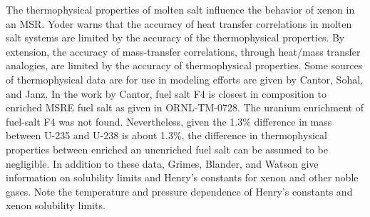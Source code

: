 The thermophysical properties of molten salt influence the behavior of xenon in an MSR.  Yoder warns that the accuracy of heat transfer correlations in molten salt systems are limited by the accuracy of the thermophysical properties.\cite{Yoder2014} By extension, the accuracy of mass-transfer correlations, through heat/mass transfer analogies, are limited by the accuracy of thermophysical properties.  Some sources of thermophysical data are for use in modeling efforts are given by Cantor, Sohal, and Janz. \cite{ORNLTM2316,Sohal2010,Janz2013} In the work by Cantor, fuel salt F4 is closest in composition to enriched MSRE fuel salt as given in ORNL-TM-0728.  The uranium enrichment of fuel-salt F4 was not found. Nevertheless, given the 1.3\% difference in mass between U-235 and U-238 is about 1.3\%, the difference in thermophysical properties between enriched an unenriched fuel salt can be assumed to be negligible.  In addition to these data, Grimes, Blander, and Watson give information on solubility limits and Henry’s constants for xenon and other noble gases.\cite{Grimes1958, Blander1959, Watson1962} Note the temperature and pressure dependence of Henry’s constants and xenon solubility limits. 

